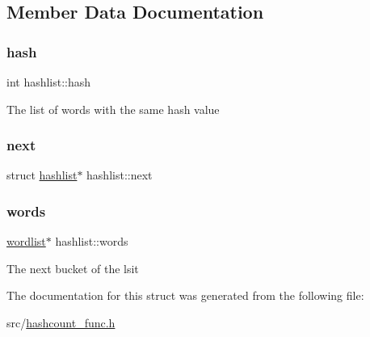 \subsection{Member Data Documentation}
\mbox{\label{structhashlist_aab67bf6a16fd9f0ae1ad7190acc95298}} 
\subsubsection{\texorpdfstring{hash}{hash}}
{\footnotesize\ttfamily int hashlist\+::hash}

The list of words with the same hash value \mbox{\label{structhashlist_ac31c298110f5630adfb6e051cf8657ac}} 
\subsubsection{\texorpdfstring{next}{next}}
{\footnotesize\ttfamily struct \hyperlink{structhashlist}{hashlist}$\ast$ hashlist\+::next}

\mbox{\label{structhashlist_a62f143e3e8911dccb242579a7f06e973}} 
\subsubsection{\texorpdfstring{words}{words}}
{\footnotesize\ttfamily \hyperlink{structwordlist}{wordlist}$\ast$ hashlist\+::words}

The next bucket of the lsit 

The documentation for this struct was generated from the following file\+:\begin{DoxyCompactItemize}
\item 
src/\hyperlink{hashcount__func_8h}{hashcount\+\_\+func.\+h}\end{DoxyCompactItemize}
